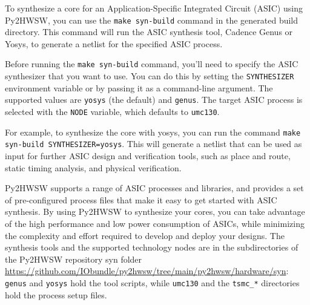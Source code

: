 %

To synthesize a core for an Application-Specific Integrated Circuit (ASIC) using Py2HWSW, you can use the \texttt{make syn-build} command in the generated build directory. This command will run the ASIC synthesis tool, Cadence Genus or Yosys, to generate a netlist for the specified ASIC process.

Before running the \texttt{make syn-build} command, you'll need to specify the ASIC synthesizer that you want to use. You can do this by setting the \texttt{SYNTHESIZER} environment variable or by passing it as a command-line argument. The supported values are \texttt{yosys} (the default) and \texttt{genus}. The target ASIC process is selected with the \texttt{NODE} variable, which defaults to \texttt{umc130}.

For example, to synthesize the core with yosys, you can run the command \texttt{make syn-build SYNTHESIZER=yosys}. This will generate a netlist that can be used as input for further ASIC design and verification tools, such as place and route, static timing analysis, and physical verification.

Py2HWSW supports a range of ASIC processes and libraries, and provides a set of pre-configured process files that make it easy to get started with ASIC synthesis. By using Py2HWSW to synthesize your cores, you can take advantage of the high performance and low power consumption of ASICs, while minimizing the complexity and effort required to develop and deploy your designs.
The synthesis tools and the supported technology nodes are in the subdirectories of the Py2HWSW repository syn folder \url{https://github.com/IObundle/py2hwsw/tree/main/py2hwsw/hardware/syn}: \texttt{genus} and \texttt{yosys} hold the tool scripts, while \texttt{umc130} and the \texttt{tsmc\_*} directories hold the process setup files.
